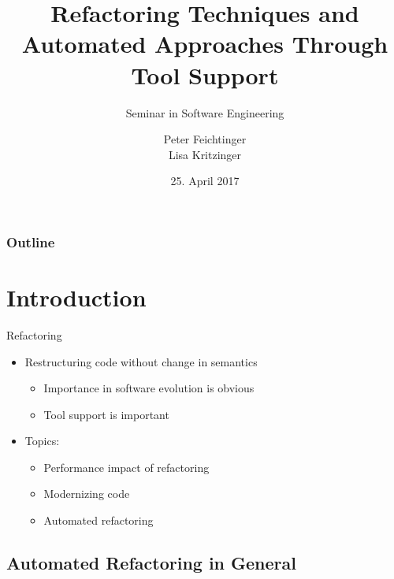 \documentclass{beamer}
\title[Refactoring]{Refactoring Techniques and Automated Approaches Through Tool Support}
\subtitle{Seminar in Software Engineering}
\institute[]{Institute for Software Systems Engineering\\Johannes Kepler University Linz}
\author[Feichtinger, Kritzinger]{Peter Feichtinger\texorpdfstring{\\}{, }Lisa Kritzinger} %
\date{25. April 2017}
\begin{document}
\begin{frame}
  \titlepage
\end{frame}

\begin{frame}
  \frametitle{Outline}
  \tableofcontents[] 
\end{frame}


\section{Introduction}  %

\begin{frame}{Refactoring}
  \begin{itemize}
    \item Restructuring code without change in semantics
    \begin{itemize}
      \item Importance in software evolution is obvious
      \item Tool support is important
    \end{itemize}
  \end{itemize}
  \pause
  \begin{itemize}
    \item Topics:
    \begin{itemize}
      \item Performance impact of refactoring
      \item Modernizing code
      \item Automated refactoring
    \end{itemize}
  \end{itemize}
\end{frame}

\subsection{Automated Refactoring in General}
\end{document}
